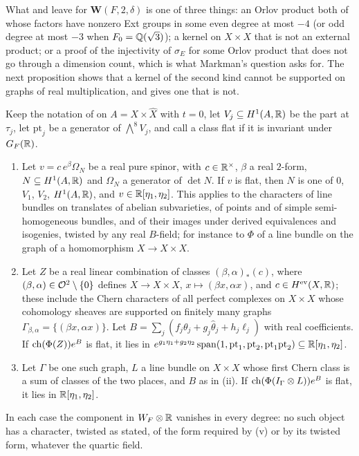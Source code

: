 What  and  leave for
$\mathbf{W}(F,2,\delta)$ is one of three things: an Orlov product both of
whose factors have nonzero Ext groups in some even degree at most $-4$ (or odd
degree at most $-3$ when $F_{0}=\mathbb{Q}(\sqrt3)$); a kernel on $X\times X$ that is
not an external product; or a proof of the injectivity of $\sigma_{E}$ for
some Orlov product that does not go through a dimension count, which is what
Markman's question \cite[Question~11.2.2]{Mar25c} asks for. The next
proposition shows that a kernel of the second kind cannot be supported on
graphs of real multiplication, and  gives one
that is not.

\begin{proposition}
\label{prop:quarticexclusions}
Keep the notation of  on $A=X\times\widehat X$
with $t=0$, let $V_{j}\subseteq H^{1}(A,\mathbb{R})$ be the part at $\tau_{j}$, let
$\mathrm{pt}_{j}$ be a generator of $\bigwedge^{8}V_{j}$, and call a class
flat if it is invariant under $G_{F}(\mathbb{R})$.
\begin{enumerate}[label=\textup{(\roman*)},leftmargin=2.6em,itemsep=2pt]
\item Let $v=c\,e^{\beta}\Omega_{N}$ be a real pure spinor, with
  $c\in\mathbb{R}^{\times}$, $\beta$ a real $2$-form, $N\subseteq H^{1}(A,\mathbb{R})$ and
  $\Omega_{N}$ a generator of $\det N$. If $v$ is flat, then $N$ is one of
  $0$, $V_{1}$, $V_{2}$, $H^{1}(A,\mathbb{R})$, and $v\in\mathbb{R}[\eta_{1},\eta_{2}]$.
  This applies to the characters of line bundles on translates of abelian
  subvarieties, of points and of simple semi-homogeneous bundles, and of
  their images under derived equivalences and isogenies, twisted by any real
  $B$-field; for instance to $\Phi$ of a line bundle on the graph of a
  homomorphism $X\to X\times X$.
\item Let $Z$ be a real linear combination of classes $(\beta,\alpha)_{*}(c)$,
  where $(\beta,\alpha)\in\mathcal{O}^{2}\setminus\{0\}$ defines
  $X\to X\times X$, $x\mapsto(\beta x,\alpha x)$, and $c\in
  H^{\mathrm{ev}}(X,\mathbb{R})$; these include the Chern characters of all perfect
  complexes on $X\times X$ whose cohomology sheaves are supported on finitely
  many graphs $\Gamma_{\beta,\alpha}=\{(\beta x,\alpha x)\}$. Let
  $B=\sum_{j}(f_{j}\theta_{j}+g_{j}\widehat\theta_{j}+h_{j}\ell_{j})$ with real
  coefficients. If $\operatorname{ch}(\Phi(Z))e^{B}$ is flat, it lies in
  $e^{g_{1}\eta_{1}+g_{2}\eta_{2}}\,\mathrm{span}(1,\mathrm{pt}_{1},
  \mathrm{pt}_{2},\mathrm{pt}_{1}\mathrm{pt}_{2})\subseteq\mathbb{R}[\eta_{1},\eta_{2}]$.
\item Let $\Gamma$ be one such graph, $L$ a line bundle on $X\times X$ whose
  first Chern class is a sum of classes of the two places, and $B$ as in
  (ii). If $\operatorname{ch}(\Phi(I_{\Gamma}\otimes L))e^{B}$ is flat, it lies in
  $\mathbb{R}[\eta_{1},\eta_{2}]$.
\end{enumerate}
In each case the component in $W_{F}\otimes\mathbb{R}$ vanishes in every degree: no
such object has a character, twisted as stated, of the form required by
(v) or by its twisted form, whatever the quartic
field.
\end{proposition}

